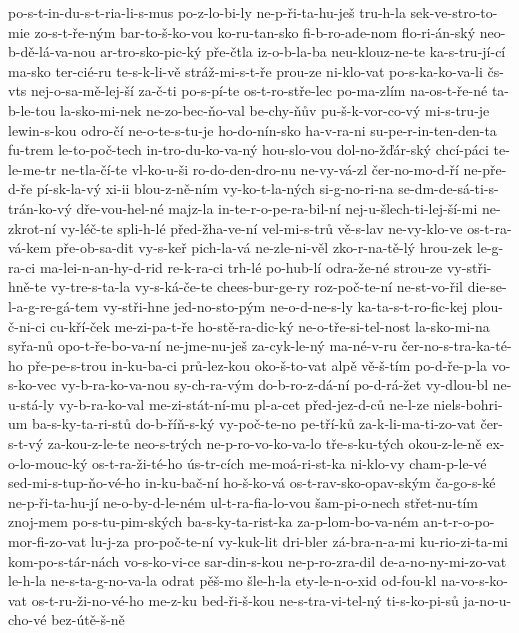{po-s-t-in-du-s-t-ria-li-s-mus
po-z-lo-bi-ly
ne-p-ři-ta-hu-ješ
tru-h-la
sek-ve-stro-to-mie
zo-s-t-ře-ným
bar-to-š-ko-vou
ko-ru-tan-sko
fi-b-ro-ade-nom
flo-ri-án-ský
neo-b-dě-lá-va-nou
ar-tro-sko-pic-ký
pře-čtla
iz-o-b-la-ba
neu-klouz-ne-te
ka-s-tru-jí-cí
ma-sko
ter-cié-ru
te-s-k-li-vě
stráž-mi-s-t-ře
prou-ze
ni-klo-vat
po-s-ka-ko-va-li
čs-vts
nej-o-sa-mě-lej-ší
za-č-ti
po-s-pí-te
os-t-ro-stře-lec
po-ma-zlím
na-os-t-ře-né
ta-b-le-tou
la-sko-mi-nek
ne-zo-bec-ňo-val
be-chy-ňův
pu-š-k-vor-co-vý
mi-s-tru-je
lewin-s-kou
odro-čí
ne-o-te-s-tu-je
ho-do-nín-sko
ha-v-ra-ni
su-pe-r-in-ten-den-ta
fu-trem
le-to-poč-tech
in-tro-du-ko-va-ný
hou-slo-vou
dol-no-žďár-ský
chcí-páci
te-le-me-tr
ne-tla-čí-te
vl-ko-u-ši
ro-do-den-dro-nu
ne-vy-vá-zl
čer-no-mo-d-ří
ne-pře-d-ře
pí-sk-la-vý
xi-ii
blou-z-ně-ním
vy-ko-t-la-ných
si-g-no-ri-na
se-dm-de-sá-ti-s-trán-ko-vý
dře-vou-hel-né
majz-la
in-te-r-o-pe-ra-bil-ní
nej-u-šlech-ti-lej-ší-mi
ne-zkrot-ní
vy-léč-te
spli-h-lé
před-žha-ve-ní
vel-mi-s-trů
vě-s-lav
ne-vy-klo-ve
os-t-ra-vá-kem
pře-ob-sa-dit
vy-s-keř
pich-la-vá
ne-zle-ni-věl
zko-r-na-tě-lý
hrou-zek
le-g-ra-ci
ma-lei-n-an-hy-d-rid
re-k-ra-ci
trh-lé
po-hub-lí
odra-že-né
strou-ze
vy-stři-hně-te
vy-tre-s-ta-la
vy-s-ká-če-te
chees-bur-ge-ry
roz-poč-te-ní
ne-st-vo-řil
die-se-l-a-g-re-gá-tem
vy-stři-hne
jed-no-sto-pým
ne-o-d-ne-s-ly
ka-ta-s-t-ro-fic-kej
plou-č-ni-ci
cu-kří-ček
me-zi-pa-t-ře
ho-stě-ra-dic-ký
ne-o-tře-si-tel-nost
la-sko-mi-na
syřa-nů
opo-t-ře-bo-va-ní
ne-jme-nu-ješ
za-cyk-le-ný
ma-né-v-ru
čer-no-s-tra-ka-té-ho
pře-pe-s-trou
in-ku-ba-ci
prů-lez-kou
oko-š-to-vat
alpě
vě-š-tím
po-d-ře-p-la
vo-s-ko-vec
vy-b-ra-ko-va-nou
sy-ch-ra-vým
do-b-ro-z-dá-ní
po-d-rá-žet
vy-dlou-bl
ne-u-stá-ly
vy-b-ra-ko-val
me-zi-stát-ní-mu
pl-a-cet
před-jez-d-ců
ne-l-ze
niels-bohri-um
ba-s-ky-ta-ri-stů
do-b-říň-s-ký
vy-poč-te-no
pe-tří-ků
za-k-li-ma-ti-zo-vat
čer-s-t-vý
za-kou-z-le-te
neo-s-trých
ne-p-ro-vo-ko-va-lo
tře-s-ku-tých
okou-z-le-ně
ex-o-lo-mouc-ký
os-t-ra-ži-té-ho
ús-tr-cích
me-moá-ri-st-ka
ni-klo-vy
cham-p-le-vé
sed-mi-s-tup-ňo-vé-ho
in-ku-bač-ní
ho-š-ko-vá
os-t-rav-sko-opav-ským
ča-go-s-ké
ne-p-ři-ta-hu-jí
ne-o-by-d-le-ném
ul-t-ra-fia-lo-vou
šam-pi-o-nech
střet-nu-tím
znoj-mem
po-s-tu-pim-ských
ba-s-ky-ta-rist-ka
za-p-lom-bo-va-ném
an-t-r-o-po-mor-fi-zo-vat
lu-j-za
pro-poč-te-ní
vy-kuk-lit
dri-bler
zá-bra-n-a-mi
ku-rio-zi-ta-mi
kom-po-s-tár-nách
vo-s-ko-vi-ce
sar-din-s-kou
ne-p-ro-zra-dil
de-a-no-ny-mi-zo-vat
le-h-la
ne-s-ta-g-no-va-la
odrat
pěš-mo
šle-h-la
ety-le-n-o-xid
od-fou-kl
na-vo-s-ko-vat
os-t-ru-ži-no-vé-ho
me-z-ku
bed-ři-š-kou
ne-s-tra-vi-tel-ný
ti-s-ko-pi-sů
ja-no-u-cho-vé
bez-útě-š-ně
}
